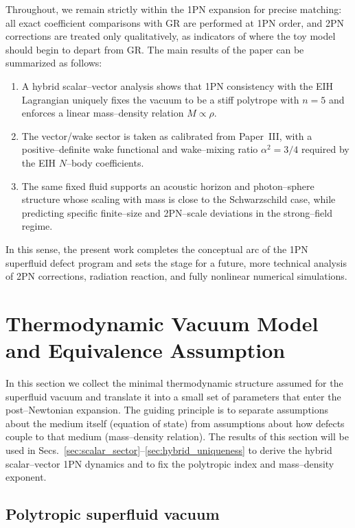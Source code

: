 \documentclass[11pt]{article}
\begin{document}
Throughout, we remain strictly within the 1PN expansion for precise
matching: all exact coefficient comparisons with GR are performed at 1PN
order, and 2PN corrections are treated only qualitatively, as indicators of
where the toy model should begin to depart from GR.  The main results of the
paper can be summarized as follows:
\begin{enumerate}
  \item A hybrid scalar--vector analysis shows that 1PN consistency with the
  EIH Lagrangian uniquely fixes the vacuum to be a stiff polytrope with
  $n=5$ and enforces a linear mass--density relation $M \propto \rho$.
  \item The vector/wake sector is taken as calibrated from Paper~III, with a
  positive--definite wake functional and wake--mixing ratio \(\alpha^2=3/4\)
  required by the EIH $N$--body coefficients.
  \item The same fixed fluid supports an acoustic horizon and photon--sphere
  structure whose scaling with mass is close to the Schwarzschild case,
  while predicting specific finite--size and 2PN--scale deviations in the
  strong--field regime.
\end{enumerate}
In this sense, the present work completes the conceptual arc of the 1PN
superfluid defect program and sets the stage for a future, more technical
analysis of 2PN corrections, radiation reaction, and fully nonlinear
numerical simulations.

\section{Thermodynamic Vacuum Model and Equivalence Assumption}
\label{sec:thermo_model}

In this section we collect the minimal thermodynamic structure assumed for
the superfluid vacuum and translate it into a small set of parameters that
enter the post--Newtonian expansion.  The guiding principle is to separate
assumptions about the medium itself (equation of state) from assumptions
about how defects couple to that medium (mass--density relation).  The
results of this section will be used in
Secs.~\ref{sec:scalar_sector}--\ref{sec:hybrid_uniqueness} to derive the
hybrid scalar--vector 1PN dynamics and to fix the polytropic index and
mass--density exponent.

\subsection{Polytropic superfluid vacuum}
\label{subsec:thermo-polytrope}
\end{document}
